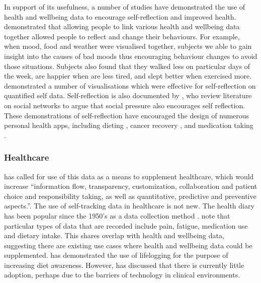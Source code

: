 \documentclass[a4paper]{scrartcl}     %
\begin{document}
      In support of its usefulness, a number of studies have demonstrated the use of health and wellbeing data to encourage self-reflection and improved health. \citet{Bentley2013} demonstrated that allowing people to link various health and wellbeing data together allowed people to reflect and change their behaviours. For example, when mood, food and weather were visualised together, subjects we able to gain insight into the causes of bad moods thus encouraging behaviour changes to avoid those situations. Subjects also found that they walked less on particular days of the week, are happier when are less tired, and slept better when exercised more. \citet{Cuttone2014} demonstrated a number of visualisations which were effective for self-reflection on quantified self data. Self-reflection is also documented by \citep{Kamal2010}, who review literature on social networks to argue that social pressure also encourages self reflection. These demonstrations of self-reflection have encouraged the design of numerous personal health apps, including dieting \citep{Choe2014}, cancer recovery \citep{Jacobs2014}, and medication taking \citep{Stawarz2014,Lee2014}.


    \subsubsection{Healthcare}

      \citet{Swan2009} has called for use of this data as a means to supplement healthcare, which would increase ``information flow, transparency, customization, collaboration and patient choice and responsibility taking, as well as quantitative, predictive and preventive aspects.''. The use of self-tracking data in healthcare is not new. The health diary has been popular since the 1950's as a data collection method \citep{Richardson1994}.  \citet{Richardson1994} note that particular types of data that are recorded include pain, fatigue, medication use and dietary intake. This shares overlap with health and wellbeing data, suggesting there are existing use cases where health and wellbeing data could be supplemented. \citet{OLoughlin2013} has demonstrated the use of lifelogging for the purpose of increasing diet awareness. However, \citet{Swan2009} has discussed that there is currently little adoption, perhaps due to the barriers of technology in clinical environments.
\end{document}
